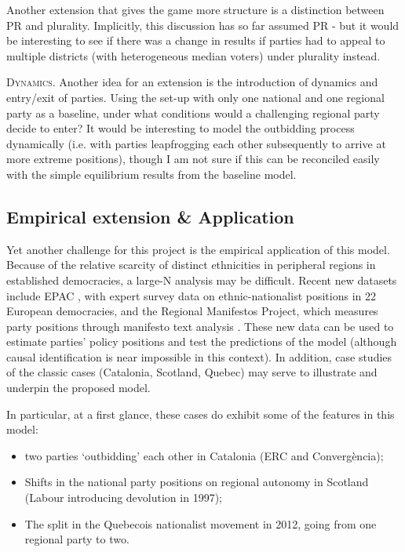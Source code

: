 \documentclass[11pt]{article}
\begin{document}
Another extension that gives the game more structure is a distinction between PR and plurality. Implicitly, this discussion has so far assumed PR - but it would be interesting to see if there was a change in results if parties had to appeal to multiple districts (with heterogeneous median voters) under plurality instead.

\textsc{Dynamics.} Another idea for an extension is the introduction of dynamics and entry/exit of parties. Using the set-up with only one national and one regional party as a baseline, under what conditions would a challenging regional party decide to enter? It would be interesting to model the outbidding process dynamically (i.e. with parties leapfrogging each other subsequently to arrive at more extreme positions), though I am not sure if this can be reconciled easily with the simple equilibrium results from the baseline model.

\subsection{Empirical extension \& Application}

Yet another challenge for this project is the empirical application of this model. Because of the relative scarcity of distinct ethnicities in peripheral regions in established democracies, a large-N analysis may be difficult. Recent new datasets include EPAC \parencite{Szocsik2015}, with expert survey data on ethnic-nationalist positions in 22 European democracies, and the Regional Manifestos Project, which measures party positions through manifesto text analysis \parencite{Alonso2013}. These new data can be used to estimate parties' policy positions and test the predictions of the model (although causal identification is near impossible in this context). In addition, case studies of the classic cases (Catalonia, Scotland, Quebec) may serve to illustrate and underpin the proposed model.

In particular, at a first glance, these cases do exhibit some of the features in this model: 
\begin{itemize}
    \item two parties `outbidding' each other in Catalonia (ERC and Convergència);
    \item Shifts in the national party positions on regional autonomy in Scotland (Labour introducing devolution in 1997);
    \item The split in the Quebecois nationalist movement in 2012, going from one regional party to two.
\end{itemize}
\end{document}
